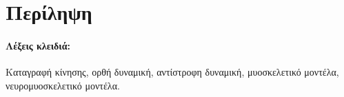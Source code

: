 \section*{Περίληψη}

\paragraph{\textbf{Λέξεις κλειδιά:}}Καταγραφή κίνησης, ορθή δυναμική, αντίστροφη δυναμική, μυοσκελετικό μοντέλα, νευρομυοσκελετικό μοντέλα.

\section*{\texorpdfstring{}{}}

\paragraph{\textbf{}} 

\thispagestyle{empty}